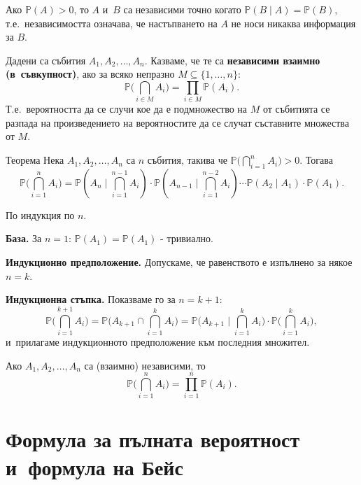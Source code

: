 \begin{corbox}[]
Ако $\mathbb{P}(A)>0$, то $A$ и~$B$ са независими точно когато
$\mathbb{P}(B\mid A) = \mathbb{P}(B)$, т.е.\ независимостта означава,
че настъпването на $A$ не носи никаква информация за $B$.
\end{corbox}

\begin{defbox}
Дадени са събития $A_1,A_2,\dots,A_n$. Казваме, че те са
\textbf{независими взаимно (в~съвкупност)}, ако за всяко непразно
$M\subseteq\{1,\dots,n\}$:
\[
  \mathbb{P}\Big(\bigcap_{i\in M}A_i\Big) = \prod_{i\in M}\mathbb{P}(A_i).
\]
Т.е.\ вероятността да се случи кое да е подмножество на $M$ от
събитията се разпада на произведението на вероятностите да се
случат съставните множества от $M$.
\end{defbox}

\begin{thmbox}[]{Теорема}
Нека $A_1,A_2,\dots,A_n$ са $n$ събития, такива че
$\mathbb{P}\big(\bigcap_{i=1}^{n}A_i\big)>0$. Тогава
\[
  \mathbb{P}\Big(\bigcap_{i=1}^{n}A_i\Big) = \mathbb{P}(A_n\mid \textstyle\bigcap_{i=1}^{n-1}A_i)\cdot\mathbb{P}(A_{n-1}\mid\textstyle\bigcap_{i=1}^{n-2}A_i)\cdots\mathbb{P}(A_2\mid A_1)\cdot\mathbb{P}(A_1).
\]
\end{thmbox}

\begin{proofbox}
По индукция по $n$.

\textbf{База.} За $n=1$: $\mathbb{P}(A_1)=\mathbb{P}(A_1)$ - тривиално.

\textbf{Индукционно предположение.} Допускаме, че равенството е
изпълнено за някое $n=k$.

\textbf{Индукционна стъпка.} Показваме го за $n=k+1$:
\[
  \mathbb{P}\Big(\bigcap_{i=1}^{k+1}A_i\Big) = \mathbb{P}\Big(A_{k+1}\cap\bigcap_{i=1}^{k}A_i\Big) = \mathbb{P}\Big(A_{k+1}\;\Big|\;\bigcap_{i=1}^{k}A_i\Big)\cdot\mathbb{P}\Big(\bigcap_{i=1}^{k}A_i\Big),
\]
и~прилагаме индукционното предположение към последния множител. \qedbg
\end{proofbox}

\begin{corbox}[]
Ако $A_1,A_2,\dots,A_n$ са (взаимно) независими, то
\[
  \mathbb{P}\Big(\bigcap_{i=1}^{n}A_i\Big) = \prod_{i=1}^{n}\mathbb{P}(A_i).
\]
\end{corbox}

\section{Формула за пълната вероятност и~формула на Бейс}

